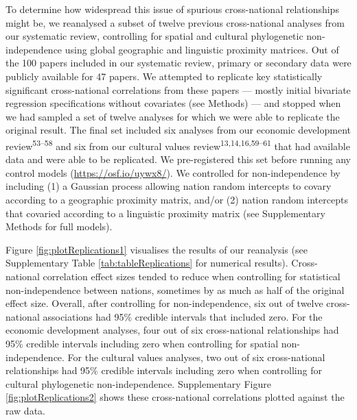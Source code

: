 \documentclass[
  man,floatsintext]{apa6}
\begin{document}
To determine how widespread this issue of spurious cross-national relationships might be, we reanalysed a subset of twelve previous cross-national analyses from our systematic review, controlling for spatial and cultural phylogenetic non-independence using global geographic and linguistic proximity matrices. Out of the 100 papers included in our systematic review, primary or secondary data were publicly available for 47 papers. We attempted to replicate key statistically significant cross-national correlations from these papers --- mostly initial bivariate regression specifications without covariates (see Methods) --- and stopped when we had sampled a set of twelve analyses for which we were able to replicate the original result. The final set included six analyses from our economic development review\textsuperscript{53--58} and six from our cultural values review\textsuperscript{13,14,16,59--61} that had available data and were able to be replicated. We pre-registered this set before running any control models (\url{https://osf.io/uywx8/}). We controlled for non-independence by including (1) a Gaussian process allowing nation random intercepts to covary according to a geographic proximity matrix, and/or (2) nation random intercepts that covaried according to a linguistic proximity matrix (see Supplementary Methods for full models).

Figure \ref{fig:plotReplications1} visualises the results of our reanalysis (see Supplementary Table \ref{tab:tableReplications} for numerical results). Cross-national correlation effect sizes tended to reduce when controlling for statistical non-independence between nations, sometimes by as much as half of the original effect size. Overall, after controlling for non-independence, six out of twelve cross-national associations had 95\% credible intervals that included zero. For the economic development analyses, four out of six cross-national relationships had 95\% credible intervals including zero when controlling for spatial non-independence. For the cultural values analyses, two out of six cross-national relationships had 95\% credible intervals including zero when controlling for cultural phylogenetic non-independence. Supplementary Figure \ref{fig:plotReplications2} shows these cross-national correlations plotted against the raw data.
\end{document}
